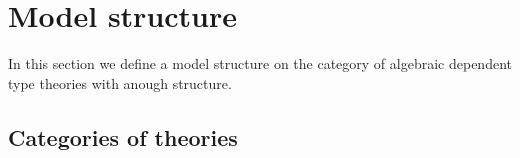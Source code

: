 \documentclass[reqno]{amsart}
\theoremstyle{definition}
\theoremstyle{remark}
\numberwithin{figure}{section}
\begin{document}
\begin{comment}
\begin{lem}[equiv-lem]
Let $f : T_1 \to T_2$ be a premorphism of theories under $I$.
Suppose that there are a pseudomorphism $g : T_2 \to T_1$ of degrere 0 and a pseudomorphism $h : T_2 \to T_2$ of degree 1 which satisfy the following conditions:
\begin{enumerate}
\item $g$ and $h$ preserve theorems of the form $f(\varphi) \sststile{}{V} \psi$.
\item $id_{T_1} \leq g \circ f$,
\item $I \circ f \leq h \circ f$,
\item For every term $t$, sequents
\begin{align*}
t\!\downarrow \land\ h(t)\!\downarrow\ & \sststile{}{V} left^*(h(t)) = f(g(t)) \\
t\!\downarrow \land\ h(t)\!\downarrow\ & \sststile{}{V} right^*(h(t)) = t
\end{align*}
are derivable in $T_2$.
\end{enumerate}
Then the morphism determined by $f$ is a Morita equivalence.
\end{lem}
\begin{proof}
Let $a$ and $A$ be terms of $T_2$ and let $\varphi$ be a formula of $T_1$ such that $\varphi \sststile{T_1}{V} A\!\downarrow$ and $f(\varphi) \sststile{T_2}{V} e_p(a) = f(A)$.
Let $a' = g(a)$ and $h' = h(a)$.
Then $\varphi \sststile{T_1}{V} g(f(\varphi))$ and $g(f(\varphi)) \sststile{T_1}{V} g(e_p(a)) = g(f(A))$.
It follows that $\varphi \sststile{T_1}{V} e_p(a') = A$.
Analogously, $f(\varphi) \sststile{T_2}{V} h(f(\varphi))$ and $h(f(\varphi)) \sststile{T_2}{V} h(e_p(a)) = h(f(A))$.
Hence $f(\varphi) \sststile{T_2}{V} e_p(h') = I \times f(A)$.
The last condition implies that $f(\varphi) \sststile{T_2}{V} left^*(h') = f(a')$ and $f(\varphi) \sststile{T_2}{V} right^*(h') = a$.
\end{proof}
\end{comment}

\section{Model structure}

In this section we define a model structure on the category of algebraic dependent type theories with anough structure.

\subsection{Categories of theories}
\end{document}
